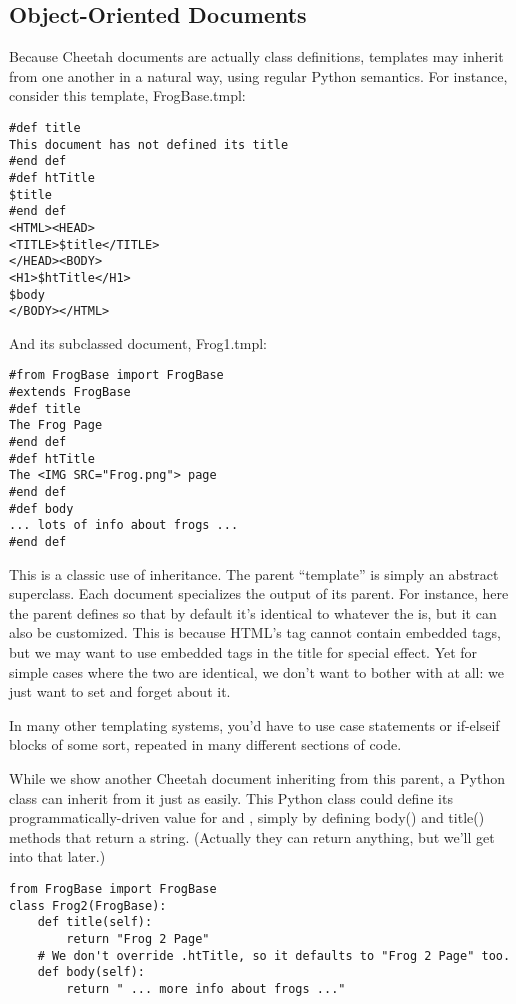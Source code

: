 \subsection{Object-Oriented Documents}
\label{howWorks.objoriented}

Because Cheetah documents are actually class definitions, templates may inherit
from one another in a natural way, using regular Python semantics. For
instance, consider this template, FrogBase.tmpl:

\begin{verbatim}
#def title
This document has not defined its title
#end def
#def htTitle
$title
#end def
<HTML><HEAD>
<TITLE>$title</TITLE>
</HEAD><BODY>
<H1>$htTitle</H1>
$body
</BODY></HTML>
\end{verbatim}

And its subclassed document, Frog1.tmpl:
\begin{verbatim}
#from FrogBase import FrogBase
#extends FrogBase
#def title
The Frog Page
#end def
#def htTitle
The <IMG SRC="Frog.png"> page
#end def
#def body
... lots of info about frogs ...
#end def
\end{verbatim}

This is a classic use of inheritance. The parent ``template'' is simply an
abstract superclass.  Each document specializes the output of its parent.
 For instance, here the parent defines
 so that by default it's identical to whatever the 
 is, but it can also be customized.  This is because HTML's
 tag cannot contain embedded tags, but we may want to use
embedded tags in the  title for special effect.  Yet for simple
cases where the two are identical, we don't want to bother with
 at all: we just want to set  and forget about
it.

In many other templating systems, you'd have to use case statements or
if-elseif blocks of some sort, repeated in many different sections of code.

While we show another Cheetah document inheriting from this parent, a Python
class can inherit from it just as easily. This Python class could define its
programmatically-driven value for  and , simply by
defining body() and title() methods that return a string.  (Actually they
can return anything, but we'll get into that later.)  

\begin{verbatim}
from FrogBase import FrogBase
class Frog2(FrogBase):
	def title(self):
		return "Frog 2 Page"
	# We don't override .htTitle, so it defaults to "Frog 2 Page" too.
	def body(self):
		return " ... more info about frogs ..."
\end{verbatim}

